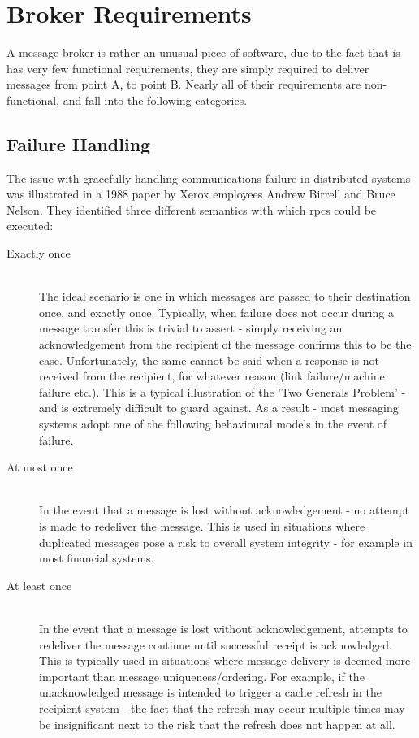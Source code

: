 \section{Broker Requirements}
\label{sec:requirements}

A message-broker is rather an unusual piece of software, due to the fact that is
has very few functional requirements, they are simply required to deliver
messages from point A, to point B. Nearly all of their requirements are
non-functional, and fall into the following categories.

\subsection{Failure Handling}
\label{sub:failureHandling}

The issue with gracefully handling communications failure in distributed systems
was illustrated in a 1988 paper by Xerox employees Andrew Birrell and Bruce
Nelson\cite{Birrell:1988:IRP:59309.59336}. They identified three different
semantics with which \glspl{rpc} could be executed:

\begin{description}
  \item[Exactly once] \hfill \\
    The ideal scenario is one in which messages are passed to their destination
    once, and exactly once. Typically, when failure does not occur during a
    message transfer this is trivial to assert - simply receiving an
    acknowledgement from the recipient of the message confirms this to be the
    case. Unfortunately, the same cannot be said when a response is not received
    from the recipient, for whatever reason (link failure/machine failure etc.).
    This is a typical illustration of the 'Two Generals
    Problem'\cite{Gray:1978:NDB:647433.723863} - and is extremely difficult to
    guard against. As a result - most messaging systems adopt one of the
    following behavioural models in the event of failure.
  \item[At most once] \hfill \\
    In the event that a message is lost without acknowledgement - no attempt is
    made to redeliver the message. This is used in situations where duplicated
    messages pose a risk to overall system integrity - for example in most
    financial systems.
  \item[At least once] \hfill \\
    In the event that a message is lost without acknowledgement, attempts to
    redeliver the message continue until successful receipt is acknowledged.
    This is typically used in situations where message delivery is deemed more
    important than message uniqueness/ordering. For example, if the
    unacknowledged message is intended to trigger a cache refresh in the
    recipient system - the fact that the refresh may occur multiple times may be
    insignificant next to the risk that the refresh does not happen at all.
\end{description}

